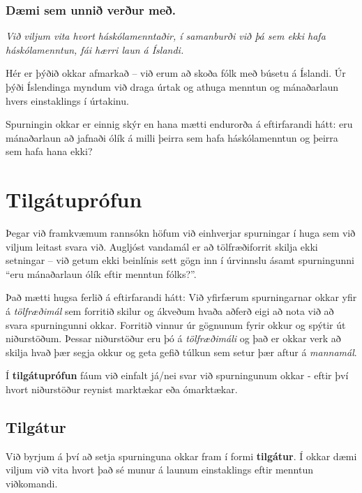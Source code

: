 \documentclass[
]{book}
\begin{document}
\hypertarget{duxe6mi-sem-unniuxf0-veruxf0ur-meuxf0.}{%
\subsection*{Dæmi sem unnið verður með.}\label{duxe6mi-sem-unniuxf0-veruxf0ur-meuxf0.}}

\emph{Við viljum vita hvort háskólamenntaðir, í samanburði við þá sem ekki
hafa háskólamenntun, fái hærri laun á Íslandi.}

Hér er þýðið okkar afmarkað -- við erum að skoða fólk með búsetu á
Íslandi. Úr þýði Íslendinga myndum við draga úrtak og athuga menntun og
mánaðarlaun hvers einstaklings í úrtakinu.

Spurningin okkar er einnig skýr en hana mætti endurorða á eftirfarandi
hátt: eru mánaðarlaun að jafnaði ólík á milli þeirra sem hafa
háskólamenntun og þeirra sem hafa hana ekki?

\hypertarget{tilguxe1tupruxf3fun}{%
\chapter{Tilgátuprófun}\label{tilguxe1tupruxf3fun}}

Þegar við framkvæmum rannsókn höfum við einhverjar spurningar í huga sem
við viljum leitast svara við. Augljóst vandamál er að tölfræðiforrit
skilja ekki setningar -- við getum ekki beinlínis sett gögn inn í
úrvinnslu ásamt spurningunni ``eru mánaðarlaun ólík eftir menntun
fólks?''.

Það mætti hugsa ferlið á eftirfarandi hátt: Við yfirfærum spurningarnar
okkar yfir á \emph{tölfræðimál} sem forritið skilur og ákveðum hvaða aðferð
eigi að nota við að svara spurningunni okkar. Forritið vinnur úr
gögnunum fyrir okkur og spýtir út niðurstöðum. Þessar niðurstöður eru þó
á \emph{tölfræðimáli} og það er okkar verk að skilja hvað þær segja okkur og
geta gefið túlkun sem setur þær aftur á \emph{mannamál}.

Í \textbf{tilgátuprófun} fáum við einfalt já/nei svar við spurningunum
okkar - eftir því hvort niðurstöður reynist marktækar eða ómarktækar.

\hypertarget{cross}{%
\section{Tilgátur}\label{cross}}

Við byrjum á því að setja spurninguna okkar fram í formi \textbf{tilgátur}. Í
okkar dæmi viljum við vita hvort það sé munur á launum einstaklings
eftir menntun viðkomandi.
\end{document}
